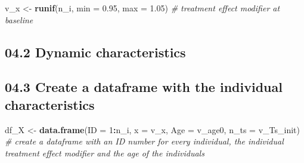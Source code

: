 \documentclass[
]{article}
\newenvironment{Shaded}{\begin{snugshade}}{\end{snugshade}}
\newcommand{\CommentTok}[1]{\textcolor[rgb]{0.56,0.35,0.01}{\textit{#1}}}
\newcommand{\DataTypeTok}[1]{\textcolor[rgb]{0.13,0.29,0.53}{#1}}
\newcommand{\DecValTok}[1]{\textcolor[rgb]{0.00,0.00,0.81}{#1}}
\newcommand{\FloatTok}[1]{\textcolor[rgb]{0.00,0.00,0.81}{#1}}
\newcommand{\KeywordTok}[1]{\textcolor[rgb]{0.13,0.29,0.53}{\textbf{#1}}}
\newcommand{\NormalTok}[1]{#1}
\newcommand{\OperatorTok}[1]{\textcolor[rgb]{0.81,0.36,0.00}{\textbf{#1}}}
\newcommand{\OtherTok}[1]{\textcolor[rgb]{0.56,0.35,0.01}{#1}}
\newcommand{\StringTok}[1]{\textcolor[rgb]{0.31,0.60,0.02}{#1}}
\begin{document}
\begin{Shaded}
\begin{Highlighting}[]
\NormalTok{v_x     <-}\StringTok{ }\KeywordTok{runif}\NormalTok{(n_i, }\DataTypeTok{min =} \FloatTok{0.95}\NormalTok{, }\DataTypeTok{max =} \FloatTok{1.05}\NormalTok{) }\CommentTok{# treatment effect modifier at baseline }
\end{Highlighting}
\end{Shaded}

\hypertarget{dynamic-characteristics}{%
\subsection{04.2 Dynamic
characteristics}\label{dynamic-characteristics}}

\begin{Shaded}
\end{Shaded}

\hypertarget{create-a-dataframe-with-the-individual-characteristics}{%
\subsection{04.3 Create a dataframe with the individual
characteristics}\label{create-a-dataframe-with-the-individual-characteristics}}

\begin{Shaded}
\begin{Highlighting}[]
\NormalTok{df_X    <-}\StringTok{ }\KeywordTok{data.frame}\NormalTok{(}\DataTypeTok{ID =} \DecValTok{1}\OperatorTok{:}\NormalTok{n_i, }\DataTypeTok{x =}\NormalTok{ v_x, }\DataTypeTok{Age =}\NormalTok{ v_age0, }\DataTypeTok{n_ts =}\NormalTok{ v_Ts_init) }\CommentTok{# create a dataframe with an ID number for every individual, the individual treatment effect modifier and the age of the individuals }
\end{Highlighting}
\end{Shaded}
\end{document}
